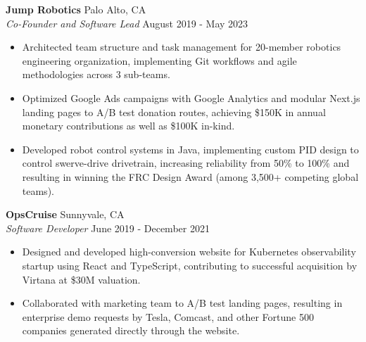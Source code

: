 \documentclass[11pt,a4paper]{article}
\begin{document}
\noindent\textbf{Jump Robotics} \hfill Palo Alto, CA\\
\textit{Co-Founder and Software Lead} \hfill August 2019 - May 2023
\begin{itemize}[itemsep=0pt]
\item Architected team structure and task management for 20-member robotics engineering organization, implementing Git workflows and agile methodologies across 3 sub-teams.
\item Optimized Google Ads campaigns with Google Analytics and modular Next.js landing pages to A/B test donation routes, achieving \$150K in annual monetary contributions as well as \$100K in-kind.
\item Developed robot control systems in Java, implementing custom PID design to control swerve-drive drivetrain, increasing reliability from 50\% to 100\% and resulting in winning the FRC Design Award (among 3,500+ competing global teams).
\end{itemize}

\noindent\textbf{OpsCruise} \hfill Sunnyvale, CA\\
\textit{Software Developer} \hfill June 2019 - December 2021
\begin{itemize}[itemsep=0pt]
\item Designed and developed high-conversion website for Kubernetes observability startup using React and TypeScript, contributing to successful acquisition by Virtana at \$30M valuation.
\item Collaborated with marketing team to A/B test landing pages, resulting in enterprise demo requests by Tesla, Comcast, and other Fortune 500 companies generated directly through the website.
\end{itemize}
\end{document}
